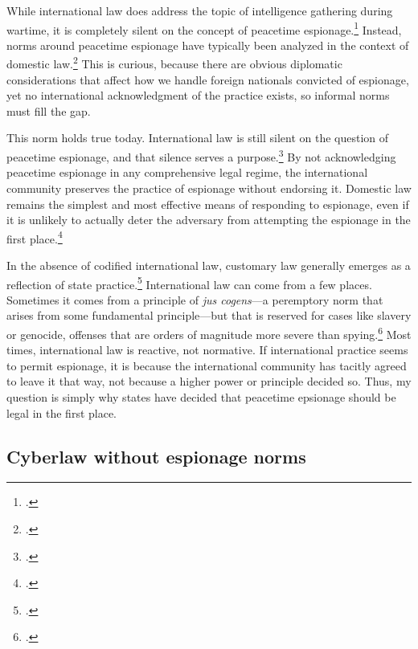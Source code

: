 \documentclass{memoir}
\begin{document}
\begin{refsegment}
While international law does address the topic of intelligence gathering during wartime, it is completely silent on the concept of peacetime espionage.\footcite{radsan_unresolved_2007} Instead, norms around peacetime espionage have typically been analyzed in the context of domestic law.\footcite{demarest_espionage_1995} This is curious, because there are obvious diplomatic considerations that affect how we handle foreign nationals convicted of espionage, yet no international acknowledgment of the practice exists, so informal norms must fill the gap.

This norm holds true today. International law is still silent on the question of peacetime espionage, and that silence serves a purpose.\footcite[p.~653]{beim_enforcing_2018} By not acknowledging peacetime espionage in any comprehensive legal regime, the international community preserves the practice of espionage without endorsing it. Domestic law remains the simplest and most effective means of responding to espionage, even if it is unlikely to actually deter the adversary from attempting the espionage in the first place.\footcite[p.~657]{beim_enforcing_2018}

In the absence of codified international law, customary law generally emerges as a reflection of state practice.\footcite[p.~628]{sulmasy_counterintuitive_2007} International law can come from a few places. Sometimes it comes from a principle of \emph{jus cogens}---a peremptory norm that arises from some fundamental principle---but that is reserved for cases like slavery or genocide, offenses that are orders of magnitude more severe than spying.\footcite[p.~629]{sulmasy_counterintuitive_2007} Most times, international law is reactive, not normative. If international practice seems to permit espionage, it is because the international community has tacitly agreed to leave it that way, not because a higher power or principle decided so. Thus, my question is simply why states have decided that peacetime epsionage should be legal in the first place.


\subsection{Cyberlaw without espionage norms}


\end{refsegment}
\end{document}
